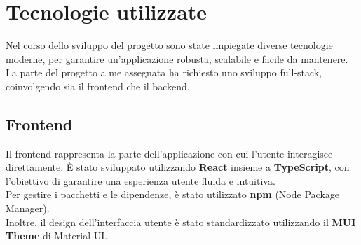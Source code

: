 \chapter{Tecnologie utilizzate}
Nel corso dello sviluppo del progetto sono state impiegate diverse tecnologie 
moderne, per garantire un'applicazione robusta, scalabile e facile da mantenere. 
La parte del progetto a me assegnata ha richiesto uno sviluppo full-stack, 
coinvolgendo sia il frontend che il backend.

\section{Frontend} 
Il frontend rappresenta la parte dell'applicazione con cui l'utente interagisce direttamente. 
È stato sviluppato utilizzando \textbf{React} insieme a \textbf{TypeScript}, 
con l'obiettivo di garantire una esperienza utente fluida e intuitiva.
\\
Per gestire i pacchetti e le dipendenze, è stato utilizzato \textbf{npm} (Node Package Manager).
\\
Inoltre, il design dell'interfaccia utente è stato standardizzato 
utilizzando il \textbf{MUI Theme} di Material-UI.

